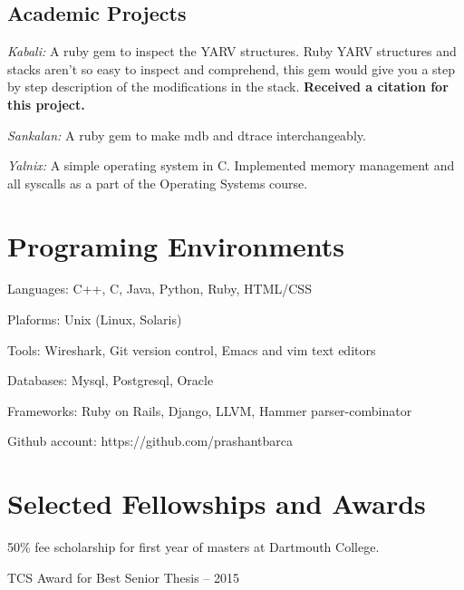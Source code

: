 \documentclass[letterpaper,10pt]{article}
\renewenvironment{itemize}{
  \begin{list}{}{
    \setlength{\leftmargin}{1.5em}
  }
}{
  \end{list}
}
\begin{document}
\subsection*{Academic Projects}
\begin{itemize}
  \setlength\itemsep{0ex}
  \item \textit{Kabali:} A ruby gem to inspect the YARV structures. Ruby YARV structures and stacks aren't so easy to inspect and comprehend, this gem would give you a step by step description of the modifications in the stack. {\bf Received a citation for this project.}
  \item \textit{Sankalan:} A ruby gem to make mdb and dtrace interchangeably.
  \item \textit{Yalnix:} A simple operating system in C. Implemented memory management and all syscalls as a part of the Operating Systems course.

  \end{itemize}


\section*{Programing Environments}
\setlength\itemsep{0ex}
\begin {itemize}
\setlength\itemsep{0ex}
\item Languages: C++, C, Java, Python, Ruby, HTML/CSS
\item Plaforms: Unix (Linux, Solaris)
\item Tools: Wireshark, Git version control, Emacs and vim text editors
\item Databases: Mysql, Postgresql, Oracle
\item Frameworks: Ruby on Rails, Django, LLVM, Hammer parser-combinator
\item Github account: https://github.com/prashantbarca
\end{itemize}

\section*{Selected Fellowships and Awards}
\setlength\itemsep{0ex}
\begin {itemize}
\setlength\itemsep{0ex}
\item 50\% fee scholarship for first year of masters at Dartmouth College. 
\item TCS Award for Best Senior Thesis -- 2015
\end{itemize}
\end{document}
